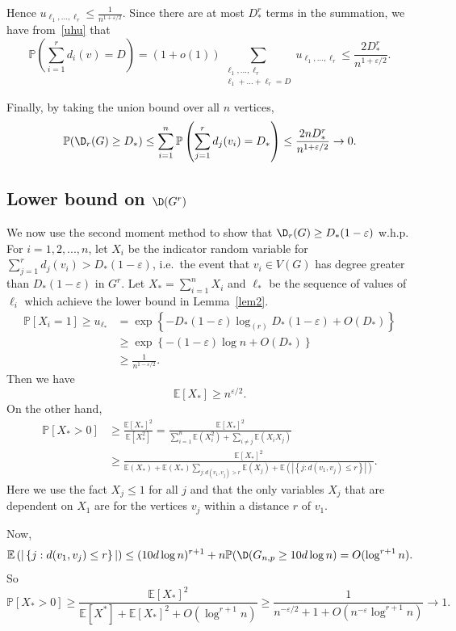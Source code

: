 \documentclass[12pt,a4paper]{article}
\def\nn{\nonumber}
\def\e{\varepsilon} \def\f{\phi} \def\F{{\Phi}} \def\vp{\varphi} \def\g{\gamma}
\newcommand{\brac}[1]{\left(#1\right)}
\newcommand{\ra}{\rightarrow}
\newcommand{\set}[1]{\left\{#1\right\}}
\def\E{\mathbb{E}}
\def\Pr{\mathbb{P}}
\def\nn{\nonumber}
\theoremstyle{plain}
\begin{document}
Hence $u_{\ell_1,...,\ell_r} \leq \frac{1}{n^{1+\e/2}}$. Since there are at most $D_*^r$ terms in the summation, we have from~\eqref{uhu} that
$$\Pr\brac{\sum\limits_{i=1}^r d_i(v) = D} =(1+o(1))\sum_{\substack{\ell_1,...,\ell_r \\ \ell_1+...+\ell_r = D}} u_{\ell_1,...,\ell_r}\leq \frac{2D_*^r}{n^{1+\e/2}}.$$

Finally, by taking the union bound over all $n$ vertices, 
$$\Pr(\D_r(G) \geq D_*)\leq \sum_{i=1}^n \Pr\brac{ \sum\limits_{j=1}^r d_j(v_i) = D_*} \le \frac{2nD_*^r}{n^{1+\e/2}}  \ra 0.$$

\subsection{Lower bound on $\D(G^r)$}
We now use the second moment method to show that $\D_r(G) \geq D_*(1-\e)$ w.h.p. For $i=1,2,...,n$, let $X_i$ be the indicator random variable for $\sum\limits_{j=1}^r d_j(v_i) > D_{*}(1-\e)$, i.e.~the event that $v_i\in V(G)$ has degree greater than $D_*(1-\e)$ in $G^r$. Let $X_* = \sum\limits_{i=1}^n X_i$ and ${\boldsymbol \ell_*}$ be the sequence of values of $\ell_i$ which achieve the lower bound in Lemma~\ref{lem2}. 
\begin{align} 
\Pr[X_i = 1] \geq u_{\boldsymbol \ell_*} 	& = \exp\set{-D_*(1-\e)\log_{(r)} D_*(1-\e)+ O(D_*)} \nn\\
& \geq \exp\set{-(1-\e)\log n + O(D_*)}\nn\\
& \geq \frac{1}{n^{1-\e/2}}.\label{extra}
\end{align}
Then we have 
\[
\E[X_*]  \geq n^{\e/2}. 
\]
On the other hand,
$$
\begin{aligned} \Pr[X_* > 0] & \geq \frac{\E[X_*]^2}{\E[X_*^2]}  = \frac{\E[X_*]^2}{\displaystyle \sum_{i=1}^n \E\brac{X_i^2} + \sum_{i \neq j} \E\brac{X_iX_j}}\\
& \geq \frac{\E[X_*]^2}{\displaystyle \E\brac{X_*} + \E\brac{X_*} \sum_{j : d(v_1, v_j) > r} \E\brac{X_j }+\E\brac{|\set{j : d(v_1, v_j) \leq r}|}}.
\end{aligned}
$$
Here we use the fact $X_j\leq 1$ for all $j$ and that the only variables $X_j$ that are dependent on $X_1$ are for the vertices $v_j$ within a distance $r$ of $v_1$.

Now,
\[
\E\brac{|\set{j : d(v_1, v_j) \leq r}|}\leq (10d\log n)^{r+1}+n\Pr(\D(G_{n,p}\geq 10d\log n)=O(\log^{r+1}n).
\]
So
\[
\Pr[X_* > 0] \geq \frac{\E[X_*]^2}{\E[X^*]+\E[X_*]^2+O(\log^{r+1}n)}\geq \frac{1}{n^{-\e/2}+1+O(n^{-\e}\log^{r+1}n)}\to 1.
\]
\end{document}
